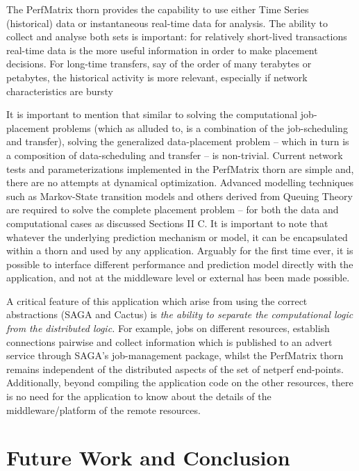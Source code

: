 \documentclass[conference,final]{IEEEtran}
\begin{document}
{The PerfMatrix thorn provides the capability to use either Time Series
(historical) data or instantaneous real-time data for analysis.  The
ability to collect and analyse both sets is important: for relatively
short-lived transactions real-time data is the more useful information
in order to make placement decisions. For long-time transfers, say of
the order of many terabytes or petabytes, the historical activity is
more relevant, especially if network characteristics are bursty

It is important to mention that similar to solving the computational
job-placement problems (which as alluded to, is a combination of the
job-scheduling and transfer), solving the generalized data-placement
problem -- which in turn is a composition of data-scheduling and
transfer -- is non-trivial.  Current network tests and
parameterizations implemented in the PerfMatrix thorn are simple and,
there are no attempts at dynamical optimization. Advanced modelling
techniques such as Markov-State transition models and others derived
from Queuing Theory are required to solve the complete placement
problem -- for both the data and computational cases as discussed
Sections II C.  It is important to note that whatever the underlying
prediction mechanism or model, it can be encapsulated within a thorn
and used by any application. Arguably for the first time ever, it is
possible to interface different performance and prediction model
directly with the application, and not at the middleware level or
external has been made possible.

A critical feature of this application which arise from using the
correct abstractions (SAGA and Cactus) is {\it the ability to separate
  the computational logic from the distributed logic.}  For example,
jobs on different resources, establish connections pairwise and
collect information which is published to an advert service through
SAGA's job-management package, whilst the PerfMatrix thorn remains
independent of the distributed aspects of the set of netperf
end-points.  Additionally, beyond compiling the application code on
the other resources, there is no need for the application to know
about the details of the middleware/platform of the remote resources.

\section{Future Work and Conclusion}

}
\end{document}
